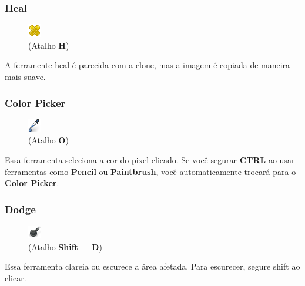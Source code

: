 \documentclass[12pt,onecolumn]{article}
\begin{document}
    \subsubsection{Heal}
      \begin{figure}
        \vspace{-40pt}
        \begin{center}
          \includegraphics{gimp-icons/stock-tool-heal-22.png} \\
          (Atalho {\bf H})
        \end{center}
        \label{fig:heal}
        \vspace{-20pt}
      \end{figure}
      A ferramente heal é parecida com a clone, mas a imagem é copiada de maneira mais suave.

    \subsubsection{Color Picker}
      \begin{figure}
        \vspace{-20pt}
        \begin{center}
          \includegraphics{gimp-icons/stock-tool-color-picker-22.png} \\
          (Atalho {\bf O})
        \end{center}
        \label{fig:color-picker}
        \vspace{-20pt}
      \end{figure}
      Essa ferramenta seleciona a cor do pixel clicado. Se você segurar {\bf
      CTRL} ao usar ferramentas como {\bf Pencil} ou {\bf Paintbrush}, você
      automaticamente trocará para o {\bf Color Picker}.
      
    \clearpage
    \subsubsection{Dodge}
      \begin{figure}
        \vspace{-40pt}
        \begin{center}
          \includegraphics{gimp-icons/stock-tool-dodge-22.png} \\
          (Atalho {\bf Shift + D})
        \end{center}
        \label{fig:dodge}
        \vspace{-20pt}
      \end{figure}
      Essa ferramenta clareia ou escurece a área afetada. Para escurecer, segure shift ao clicar.
\end{document}
